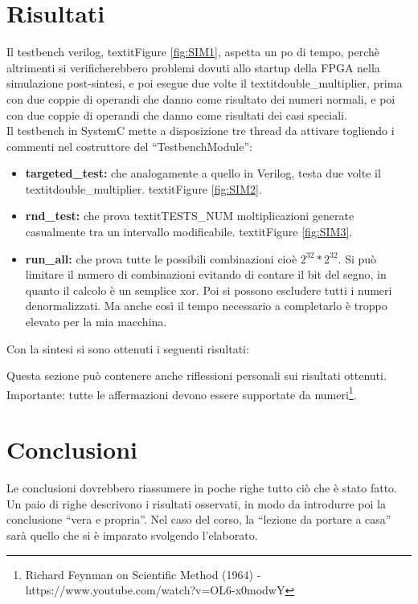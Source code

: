 \documentclass[]{IEEEtran}
\begin{document}
\section{Risultati}
Il testbench verilog, textit{Figure \ref{fig:SIM1}}, aspetta un po di tempo, perchè altrimenti si verificherebbero problemi dovuti allo startup della FPGA nella simulazione post-sintesi, e poi esegue due volte il textit{double\_multiplier}, prima con due coppie di operandi che danno come risultato dei numeri normali, e poi con due coppie di operandi che danno come risultati dei casi speciali. \\

Il testbench in SystemC mette a disposizione tre thread da attivare togliendo i commenti nel costruttore del ``TestbenchModule'':
\begin{itemize}
    \item \textbf{targeted\_test:} che analogamente a quello in Verilog, testa due volte il textit{double\_multiplier}. textit{Figure \ref{fig:SIM2}}.
    \item \textbf{rnd\_test:} che prova textit{TESTS\_NUM} moltiplicazioni generate casualmente tra un intervallo modificabile. textit{Figure \ref{fig:SIM3}}.
    \item \textbf{run\_all:} che prova tutte le possibili combinazioni cioè \(2^{32} * 2^{32}\). Si può limitare il numero di combinazioni evitando di contare il bit del segno, in quanto il calcolo è un semplice xor. Poi si possono escludere tutti i numeri denormalizzati. Ma anche così il tempo necessario a completarlo è troppo elevato per la mia macchina.
\end{itemize}
Con la sintesi si sono ottenuti i seguenti risultati:


















Questa sezione può contenere anche riflessioni personali sui risultati ottenuti. Importante: tutte le affermazioni devono essere supportate da numeri\footnote{Richard Feynman on Scientific Method (1964) -\\ https://www.youtube.com/watch?v=OL6-x0modwY}.

\section{Conclusioni}
Le conclusioni dovrebbero riassumere in poche righe  tutto ciò che è stato fatto. Un paio di righe descrivono i risultati osservati, in modo da introdurre poi la conclusione ``vera e propria''. Nel caso del corso, la ``lezione da portare a casa'' sarà quello che si è imparato svolgendo l'elaborato.
\end{document}
